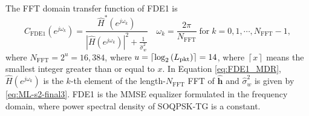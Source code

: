 The FFT domain transfer function of FDE1 is \cite[eq. (11)]{williams2013linear}
\begin{equation}
C_\text{FDE1}(e^{j\omega_k}) = \frac{\hat{H}^\ast(e^{j\omega_k})}  {|\hat{H}(e^{j\omega_k})|^2  +  \frac{1}{\hat{\sigma}^2_w}} \quad
\omega_k = \frac{2\pi}{N_\text{FFT}} \;
\text{for} \;
k=0,1,\cdots,N_\text{FFT}-1,
\label{eq:FDE1_MDR}
\end{equation}
where $N_\text{FFT} = 2^u = 16{,}384$, where $u = {\left\lceil \log_2{\left(L_\text{pkt}\right)}  \right\rceil} = 14$,
where $\left\lceil x  \right\rceil$ means the smallest integer greater than or equal to $x$.
In Equation \eqref{eq:FDE1_MDR}, $\hat{H}(e^{j\omega_k})$ is the $k$-th element of the length-$N_\text{FFT}$ FFT of $\mathbf{\hat{h}}$ and $\hat{\sigma}^2_w$ is given by \eqref{eq:ML-s2-final3}.
FDE1 is the MMSE equalizer formulated in the frequency domain, where power spectral density of SOQPSK-TG is a constant.

